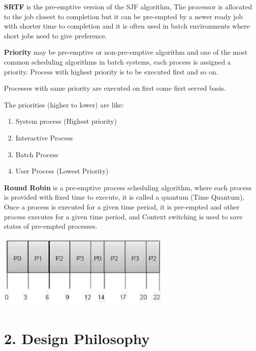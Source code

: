\documentclass{article} %
\begin{document}
\noindent \textbf{SRTF} is the pre-emptive version of the SJF algorithm, The processor is allocated to the job closest to completion but it can be pre-empted by a newer ready job with shorter time to completion and it is often used in batch environments where short jobs need to give preference.

\noindent \textbf{Priority }may be pre-emptive or non-pre-emptive algorithm and one of the most common scheduling algorithms in batch systems, each process is assigned a priority. Process with highest priority is to be executed first and so on.

\noindent Processes with same priority are executed on first come first served basis.

\noindent 

\noindent The priorities (higher to lower) are like:

\begin{enumerate}
\item  System process (Highest priority)

\item  Interactive Process

\item  Batch Process

\item  User Process (Lowest Priority)
\end{enumerate}

\noindent \textbf{}

\noindent \textbf{Round Robin }is a pre-emptive process scheduling algorithm, where each process is provided with fixed time to execute, it is called a quantum (Time Quantum), Once a process is executed for a given time period, it is pre-empted and other process executes for a given time period, and Context switching is used to save states of pre-empted processes.

\noindent \includegraphics*[width=3.34in, height=1.46in, keepaspectratio=false]{image4}


\section{ 2. Design Philosophy}
\end{document}
